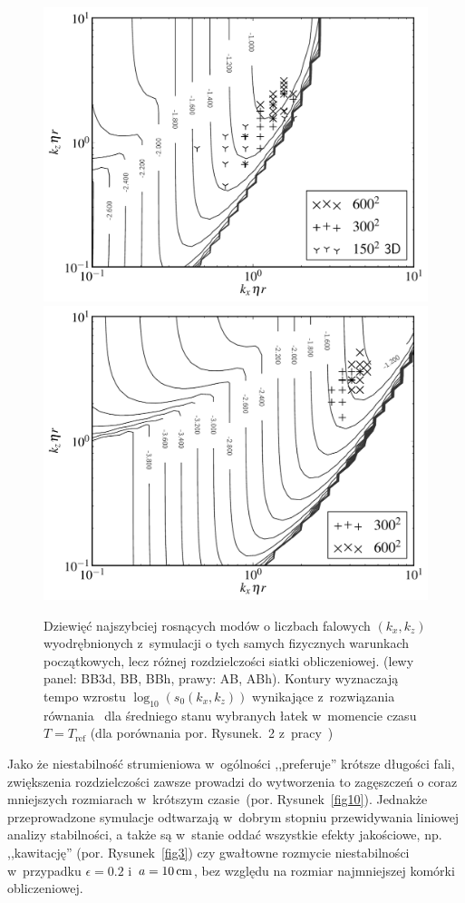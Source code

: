 \begin{figure}
  \includegraphics[width=0.48\linewidth]{figures/fig9a}
  \includegraphics[width=0.48\linewidth]{figures/fig9b}
  \caption{Dziewięć najszybciej rosnących modów o liczbach falowych $(k_x, k_z)$
     wyodrębnionych z~symulacji o tych samych fizycznych warunkach początkowych,
     lecz różnej rozdzielczości siatki obliczeniowej. (lewy panel: BB3d, BB,
     BBh, prawy: AB, ABh). Kontury wyznaczają tempo wzrostu $\log_{10}( s_0(k_x,
  k_z))$ wynikające z~rozwiązania równania~  dla średniego
  stanu wybranych łatek w~momencie czasu  $T = T_{\textrm{ref}}$ (dla porównania
  por. Rysunek.~2 z~pracy~\cite{YG05})}
   \label{fig9}
\end{figure}
 
\par Jako że niestabilność strumieniowa w~ogólności ,,preferuje'' krótsze
długości fali, zwiększenia rozdzielczości zawsze prowadzi do wytworzenia
to zagęszczeń o coraz mniejszych rozmiarach w~krótszym czasie~(por.
Rysunek~\ref{fig10}).  Jednakże przeprowadzone symulacje odtwarzają w~dobrym
stopniu przewidywania liniowej analizy stabilności, a także są w~stanie oddać
wszystkie efekty jakościowe, np. ,,kawitację'' (por. Rysunek~\ref{fig3}) czy
gwałtowne rozmycie niestabilności w~przypadku $\epsilon=0.2$ i~$a=10\hbox{$\thinspace\textrm{cm}$}$, bez
względu na rozmiar najmniejszej komórki obliczeniowej.


